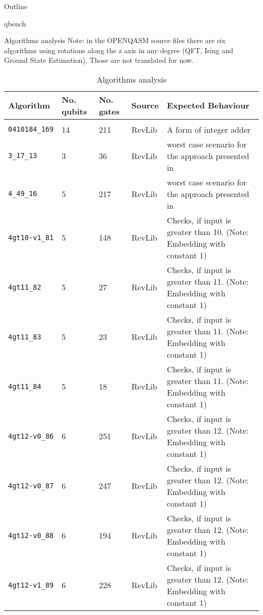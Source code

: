 \documentclass[11pt]{beamer}
\institute[]{TU Delft}
\author{Daniel Moreno Manzano}
\date{\today}
\title{}
\begin{document}
\begin{frame}{Outline}
\tableofcontents
\end{frame}

\begin{frame}[fragile,label={sec:org639c711}]{qbench}
 \begin{block}{Algorithms analysis}
\alert{Note}: in the OPENQASM source files there are six algorithms using rotations along the z axis in any degree (QFT, Ising and Ground State Estimation).
Those are not translated for now.


\begin{table}[htbp]
\caption{\label{tab:org124c51e}
Algorithms analysis}
\centering
\tiny
\begin{tabular}{|p{3cm}|p{1.5cm}|p{1cm}|p{1cm}|p{7.5cm}|}
\hline
Algorithm & No. qubits & No. gates & Source & Expected Behaviour\\
\hline
 &  &  &  & \\
\texttt{0410184\_169} & 14 & 211 & RevLib & A form of integer adder\\
\texttt{3\_17\_13} & 3 & 36 & RevLib & worst case scenario for the approach presented in \cite{Miller_2003}\\
\texttt{4\_49\_16} & 5 & 217 & RevLib & worst case scenario for the approach presented in \cite{Miller_2003}\\
\texttt{4gt10-v1\_81} & 5 & 148 & RevLib & Checks, if input is greater than 10. (Note: Embedding with constant 1)\\
\texttt{4gt11\_82} & 5 & 27 & RevLib & Checks, if input is greater than 11. (Note: Embedding with constant 1)\\
\texttt{4gt11\_83} & 5 & 23 & RevLib & Checks, if input is greater than 11. (Note: Embedding with constant 1)\\
\texttt{4gt11\_84} & 5 & 18 & RevLib & Checks, if input is greater than 11. (Note: Embedding with constant 1)\\
\texttt{4gt12-v0\_86} & 6 & 251 & RevLib & Checks, if input is greater than 12. (Note: Embedding with constant 1)\\
\texttt{4gt12-v0\_87} & 6 & 247 & RevLib & Checks, if input is greater than 12. (Note: Embedding with constant 1)\\
\texttt{4gt12-v0\_88} & 6 & 194 & RevLib & Checks, if input is greater than 12. (Note: Embedding with constant 1)\\
\texttt{4gt12-v1\_89} & 6 & 228 & RevLib & Checks, if input is greater than 12. (Note: Embedding with constant 1)\\

\end{tabular}
\end{table}
\end{block}
\end{frame}
\end{document}
